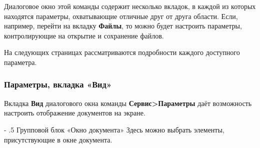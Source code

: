 ﻿\documentclass[a4paper,10pt]{article}
\makeatletter
\renewcommand\paragraph{%
   \@startsection{paragraph}{4}{0mm}%
      {-\baselineskip}%
      {.5\baselineskip}%
      {\normalfont\normalsize\bfseries}}
\makeatother
\begin{document}
 Диалоговое окно этой команды содержит несколько вкладок, в каждой из которых находятся параметры, охватывающие отличные друг от друга области. Если, например, перейти на вкладку \textbf{Файлы}, то можно будет настроить параметры, контролирующие на открытие и сохранение файлов. 
 
 На следующих страницах рассматриваются подробности каждого доступного параметра.
 
 \subsubsection{Параметры, вкладка «Вид»}
 Вкладка \textbf{Вид} диалогового окна команды \textbf{Сервис>Параметры} даёт возможность настроить отображение документов на экране.
 
 \paragraph{Групповой блок «Окно документа»}
 Здесь можно выбрать элементы, присутствующие в окне документа.
 
\end{document}
